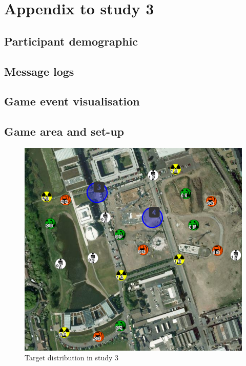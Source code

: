 \chapter{Appendix to study 3}

\section{Participant demographic}

\section{Message logs}

\section{Game event visualisation}

\section{Game area and set-up}
\begin{figure}[H]
  \centering
  \includegraphics[width=1\textwidth]{img/Appendix/targets2}
  \caption{Target distribution in study 3}
\end{figure}
